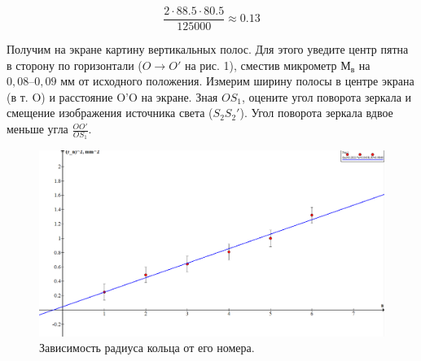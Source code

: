 \[    \frac{2\cdot 88.5 \cdot 80.5}{125000} \approx  0.13   \]

Получим на экране картину вертикальных полос. Для этого уведите
центр пятна в сторону по горизонтали ($O \rightarrow O'$ на рис. 1), сместив микрометр $М_в$ на $0,08–0,09$ мм от исходного положения. Измерим ширину
полосы в центре экрана (в т. O) и расстояние O'O на экране. Зная $OS_1$,
оцените угол поворота зеркала и смещение изображения источника света ($S_2S_2'$).
Угол поворота зеркала вдвое меньше угла $\frac{OO'}{OS_1}$.



\begin{figure}[h!]
  \centering
  \includegraphics[width=1\linewidth]{pics/lab_4_2_4_1.png}
  \caption{Зависимость радиуса кольца от его номера.}
  \label{}
\end{figure}

 

